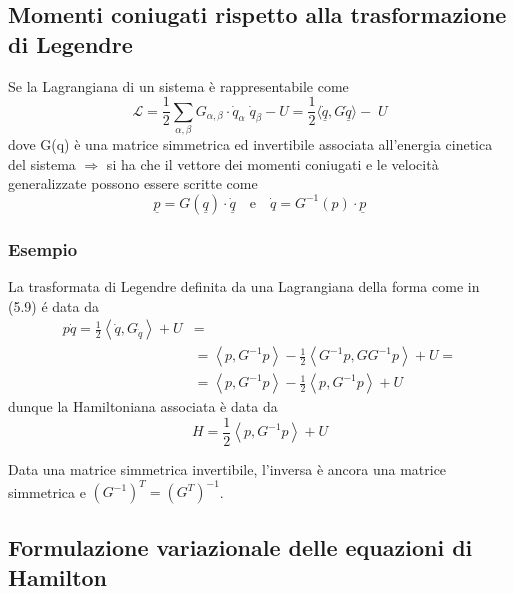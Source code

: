 \subsection{Momenti coniugati rispetto alla trasformazione di Legendre}

\begin{theorem}
Se la Lagrangiana di un sistema \`{e} rappresentabile come
\begin{equation}
	\mathcal{L} = \frac{1}{2} \sum_{\alpha, \beta}  G_{\alpha, \beta}  \cdot \dot{q}_\alpha \;\dot{q}_\beta-U = \frac{1}{2} \langle \underline{\dot q},G \underline{\dot q}\rangle - \;U
\end{equation}
dove G(q) \`{e} una matrice simmetrica ed invertibile associata all'energia cinetica del sistema $\Rightarrow$ si ha che il vettore dei momenti coniugati e le velocit\`{a} generalizzate possono essere scritte come
\begin{equation}
	\underline{p} = G(\underline{q})\cdot \underline{\dot q} \quad \text{e} \quad \dot q = G^{-1}(p) \cdot \underline p
\end{equation}
\end{theorem}

\subsubsection{Esempio}
La trasformata di Legendre definita da una Lagrangiana della forma come in (5.9) \'{e} data da
\begin{align*}
	 p \dot{q}=\frac{1}{2}\left\langle\dot{q}, G_{\dot{q}}\right\rangle+U &=\\
	&=\left\langle p, G^{-1} p\right\rangle-\frac{1}{2}\left\langle G^{-1} p, G G^{-1} p\right\rangle+U=\\
	&=\left\langle p, G^{-1} p\right\rangle-\frac{1}{2}\left\langle p, G^{-1} p\right\rangle+U
\end{align*}
dunque la Hamiltoniana associata \`{e} data da 
\begin{equation*}
	H = \dfrac{1}{2}\left\langle p, G^{-1} p\right\rangle + U
\end{equation*}

\begin{remark}
Data una matrice simmetrica invertibile, l'inversa \`{e} ancora una matrice simmetrica e $(G^{-1})^T = (G^T)^{-1}$.
\end{remark}

\subsection{Formulazione variazionale delle equazioni di Hamilton}

